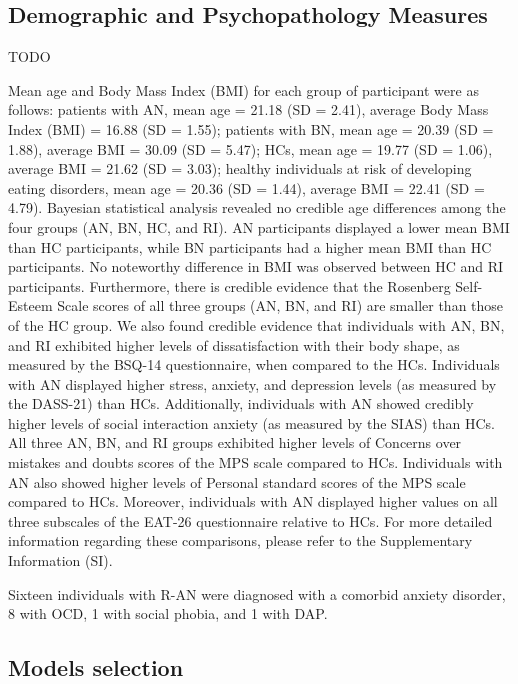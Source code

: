 \documentclass[
  man,floatsintext]{apa6}
\begin{document}
\hypertarget{demographic-and-psychopathology-measures}{%
\subsection{Demographic and Psychopathology Measures}\label{demographic-and-psychopathology-measures}}

TODO

Mean age and Body Mass Index (BMI) for each group of participant were as follows: patients with AN, mean age = 21.18 (SD = 2.41), average Body Mass Index (BMI) = 16.88 (SD = 1.55); patients with BN, mean age = 20.39 (SD = 1.88), average BMI = 30.09 (SD = 5.47); HCs, mean age = 19.77 (SD = 1.06), average BMI = 21.62 (SD = 3.03); healthy individuals at risk of developing eating disorders, mean age = 20.36 (SD = 1.44), average BMI = 22.41 (SD = 4.79).
Bayesian statistical analysis revealed no credible age differences among the four groups (AN, BN, HC, and RI). AN participants displayed a lower mean BMI than HC participants, while BN participants had a higher mean BMI than HC participants. No noteworthy difference in BMI was observed between HC and RI participants. Furthermore, there is credible evidence that the Rosenberg Self-Esteem Scale scores of all three groups (AN, BN, and RI) are smaller than those of the HC group. We also found credible evidence that individuals with AN, BN, and RI exhibited higher levels of dissatisfaction with their body shape, as measured by the BSQ-14 questionnaire, when compared to the HCs.
Individuals with AN displayed higher stress, anxiety, and depression levels (as measured by the DASS-21) than HCs. Additionally, individuals with AN showed credibly higher levels of social interaction anxiety (as measured by the SIAS) than HCs. All three AN, BN, and RI groups exhibited higher levels of Concerns over mistakes and doubts scores of the MPS scale compared to HCs. Individuals with AN also showed higher levels of Personal standard scores of the MPS scale compared to HCs. Moreover, individuals with AN displayed higher values on all three subscales of the EAT-26 questionnaire relative to HCs. For more detailed information regarding these comparisons, please refer to the Supplementary Information (SI).

Sixteen individuals with R-AN were diagnosed with a comorbid anxiety disorder, 8 with OCD, 1 with social phobia, and 1 with DAP.

\hypertarget{models-selection}{%
\subsection{Models selection}\label{models-selection}}
\end{document}
